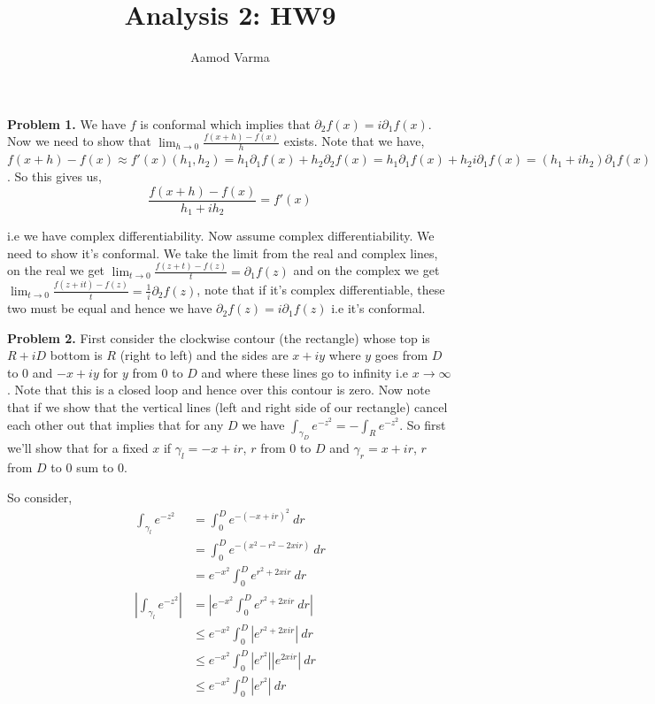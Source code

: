 \documentclass[a4paper]{article}
\title{Analysis 2: HW9}
\author{Aamod Varma}
\begin{document}
\maketitle
\textbf{Problem 1.}
We have $f$ is conformal which implies that $ \partial_2 f(x) = i \partial_1 f(x)$. Now we need to show that $\lim_{h \to 0} \frac{f(x + h) -f(x)}{h}$ exists. Note that we have, $f(x + h) - f(x) \approx f'(x) (h_{1}, h_{2}) = h_{1} \partial_1 f(x) + h_{2} \partial_{2} f(x) =h_{1} \partial_1 f(x) + h_{2} i \partial_{1} f(x) = (h_{1} + ih_{2}) \partial_1 f(x)$. So this gives us, 
\[
  \frac{f(x + h) - f(x)}{h_{1} + i h_{2}} = f'(x)
\]

i.e we have complex differentiability. Now assume complex differentiability. We need to show it's conformal. We take the limit from the real and complex lines, on the real we get $\lim_{t \to 0} \frac{f(z+ t) - f(z)}{t} = \partial_1 f(z)$ and on the complex we get $\lim_{t \to 0} \frac{f(z + it) - f(z)}{t} = \frac{1}{i} \partial_2 f(z)$, note that if it's complex differentiable, these two must be equal and hence we have $\partial_2 f(z)  = i \partial_1 f(z)$  i.e it's conformal.

\vspace{1em}


\textbf{Problem 2.} 
First consider the clockwise contour (the rectangle) whose top is $R + iD$ bottom is $R$ (right to left) and the sides are $x + iy$ where $y$ goes from $D$ to $0$ and $-x + iy$ for $y$ from $0$ to $D$ and where these lines go to infinity i.e $x \to \infty$. Note that this is a closed loop and hence over this contour is zero. Now note that if we show that the vertical lines (left and right side of our rectangle) cancel each other out that implies that for any $D$ we have $\int_{\gamma_D}^{}  e^{-z^2} = -\int_{R}^{} e^{-z^2}$. So first we'll show that for a fixed $x$ if $\gamma_{l} = -x + ir$, $r$ from $0$ to $D$ and $\gamma_{r} = x + ir$, $r$ from $D$ to $0$ sum to $0$.

\vspace{1em}

So consider,
\begin{align*}
  \int_{\gamma_l}^{} e^{-z^2}  &=  \int_{0}^{D} e^{- (-x + ir)^2}  \ dr\\
                               &=  \int_{0}^{D} e^{- (x^2 - r^2 - 2x i r)}  \ dr\\
                               &= e^{-x^2}  \int_{0}^{D}  e^{r^2 + 2x i r}  \ dr\\
  \left | \int_{\gamma_l}^{} e^{-z^2} \right | &= \left | e^{-x^2}  \int_{0}^{D}  e^{r^2 + 2x i r}  \ dr \right | \\
                                               &\le e^{-x^2}  \int_{0}^{D}   \left |e^{r^2 + 2x i r} \right | \ dr  \\
                                               &\le e^{-x^2}  \int_{0}^{D}   \left| e^{r^2} \right | \left | e^{2x i r} \right | \ dr  \\
                                               &\le e^{-x^2}  \int_{0}^{D}   \left| e^{r^2} \right | \ dr  \\
\end{align*}
\end{document}
